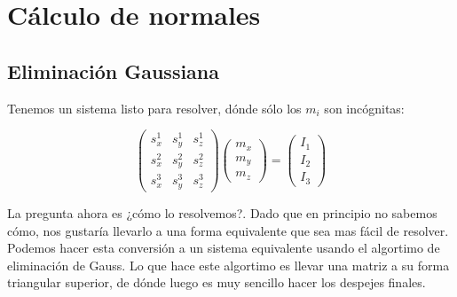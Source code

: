 


\section{Cálculo de normales}


\subsection{Eliminación Gaussiana}

Tenemos un sistema listo para resolver, dónde sólo los $m_i$ son incógnitas:

\[
\begin{pmatrix}
    s_{x}^{1} & s_{y}^{1} & s_{z}^{1} \\
    s_{x}^{2} & s_{y}^{2} & s_{z}^{2} \\
    s_{x}^{3} & s_{y}^{3} & s_{z}^{3}
\end{pmatrix}
\begin{pmatrix}
    m_{x} \\
    m_{y} \\
    m_{z}
\end{pmatrix}
=
\begin{pmatrix}
    I_{1} \\
    I_{2} \\
    I_{3}
\end{pmatrix}
\]

La pregunta ahora es ¿cómo lo resolvemos?. Dado que en principio no sabemos cómo, nos gustaría llevarlo a una forma equivalente que sea mas fácil de resolver. Podemos hacer esta conversión a un sistema equivalente usando el algortimo de eliminación de Gauss. Lo que hace este algortimo es llevar una matriz a su forma triangular superior, de dónde luego es muy sencillo hacer los despejes finales. \\

